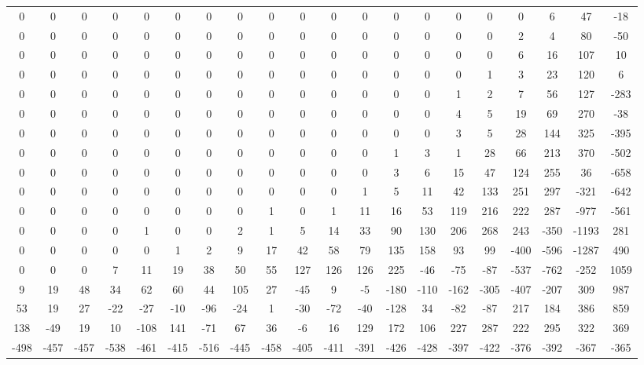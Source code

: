  \begin{tabular}{ | * {20}{c} | } 
0 & 0 & 0 & 0 & 0 & 0 & 0 & 0 & 0 & 0 & 0 & 0 & 0 & 0 & 0 & 0 & 0 & 6 & 47 & -18 \\ 
0 & 0 & 0 & 0 & 0 & 0 & 0 & 0 & 0 & 0 & 0 & 0 & 0 & 0 & 0 & 0 & 2 & 4 & 80 & -50 \\ 
0 & 0 & 0 & 0 & 0 & 0 & 0 & 0 & 0 & 0 & 0 & 0 & 0 & 0 & 0 & 0 & 6 & 16 & 107 & 10 \\ 
0 & 0 & 0 & 0 & 0 & 0 & 0 & 0 & 0 & 0 & 0 & 0 & 0 & 0 & 0 & 1 & 3 & 23 & 120 & 6 \\ 
0 & 0 & 0 & 0 & 0 & 0 & 0 & 0 & 0 & 0 & 0 & 0 & 0 & 0 & 1 & 2 & 7 & 56 & 127 & -283 \\ 
0 & 0 & 0 & 0 & 0 & 0 & 0 & 0 & 0 & 0 & 0 & 0 & 0 & 0 & 4 & 5 & 19 & 69 & 270 & -38 \\ 
0 & 0 & 0 & 0 & 0 & 0 & 0 & 0 & 0 & 0 & 0 & 0 & 0 & 0 & 3 & 5 & 28 & 144 & 325 & -395 \\ 
0 & 0 & 0 & 0 & 0 & 0 & 0 & 0 & 0 & 0 & 0 & 0 & 1 & 3 & 1 & 28 & 66 & 213 & 370 & -502 \\ 
0 & 0 & 0 & 0 & 0 & 0 & 0 & 0 & 0 & 0 & 0 & 0 & 3 & 6 & 15 & 47 & 124 & 255 & 36 & -658 \\ 
0 & 0 & 0 & 0 & 0 & 0 & 0 & 0 & 0 & 0 & 0 & 1 & 5 & 11 & 42 & 133 & 251 & 297 & -321 & -642 \\ 
0 & 0 & 0 & 0 & 0 & 0 & 0 & 0 & 1 & 0 & 1 & 11 & 16 & 53 & 119 & 216 & 222 & 287 & -977 & -561 \\ 
0 & 0 & 0 & 0 & 1 & 0 & 0 & 2 & 1 & 5 & 14 & 33 & 90 & 130 & 206 & 268 & 243 & -350 & -1193 & 281 \\ 
0 & 0 & 0 & 0 & 0 & 1 & 2 & 9 & 17 & 42 & 58 & 79 & 135 & 158 & 93 & 99 & -400 & -596 & -1287 & 490 \\ 
0 & 0 & 0 & 7 & 11 & 19 & 38 & 50 & 55 & 127 & 126 & 126 & 225 & -46 & -75 & -87 & -537 & -762 & -252 & 1059 \\ 
9 & 19 & 48 & 34 & 62 & 60 & 44 & 105 & 27 & -45 & 9 & -5 & -180 & -110 & -162 & -305 & -407 & -207 & 309 & 987 \\ 
53 & 19 & 27 & -22 & -27 & -10 & -96 & -24 & 1 & -30 & -72 & -40 & -128 & 34 & -82 & -87 & 217 & 184 & 386 & 859 \\ 
138 & -49 & 19 & 10 & -108 & 141 & -71 & 67 & 36 & -6 & 16 & 129 & 172 & 106 & 227 & 287 & 222 & 295 & 322 & 369 \\ 
-498 & -457 & -457 & -538 & -461 & -415 & -516 & -445 & -458 & -405 & -411 & -391 & -426 & -428 & -397 & -422 & -376 & -392 & -367 & -365 \\ 
 \end{tabular} 
